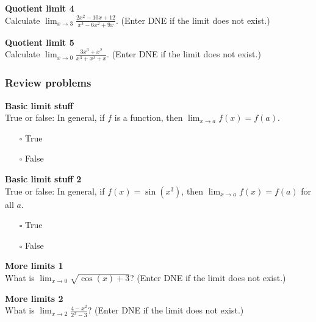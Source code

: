 \documentclass[pdftex, brazil, 12pt, twoside]{article}
\begin{document}
\begin{exercise}
  \textbf{Quotient limit 4}\\
  Calculate $\displaystyle \lim_{x \to 3}\frac{2x^2-10x+12}{x^3-6x^2+9x}$. (Enter DNE
  if the limit does not exist.)
\end{exercise}

\begin{exercise}
  \textbf{Quotient limit 5}\\
  Calculate $\displaystyle \lim_{x \to 0}\frac{3x^3+x^2}{x^3+x^2+x}$. (Enter DNE
  if the limit does not exist.)
\end{exercise}

\subsubsection{Review problems}
\label{u0-lim-quo-review-prob}

\begin{exercise}
  \textbf{Basic limit stuff}\\
  True or false: In general, if $f$ is a function, then
  $\displaystyle \lim_{x \to a}f(x) = f(a)$.
  \begin{itemize}[noitemsep]
  \item[$\square$] True
  \item[$\square$] False
  \end{itemize}
\end{exercise}

\begin{exercise}
  \textbf{Basic limit stuff 2}\\
  True or false: In general, if $f(x) = \sin{(x^3)}$, then
  $\displaystyle \lim_{x \to a}f(x) = f(a)$ for all $a$.
  \begin{itemize}[noitemsep]
  \item[$\square$] True
  \item[$\square$] False
  \end{itemize}
\end{exercise}

\begin{exercise}
  \textbf{More limits 1}\\
  What is $\displaystyle \lim_{x \to 0}\sqrt{\cos{(x)}+3}$?
  (Enter DNE if the limit does not exist.)
\end{exercise}

\begin{exercise}
  \textbf{More limits 2}\\
  What is $\displaystyle \lim_{x \to 2}\frac{4-x^2}{2^x-3}$?
  (Enter DNE if the limit does not exist.)
\end{exercise}
\end{document}
